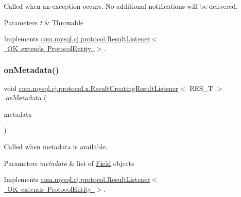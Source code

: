 Called when an exception occurs. No additional notifications will be delivered.


\begin{DoxyParams}{Parameters}
{\em t} & \mbox{\hyperlink{}{Throwable}} \\
\hline
\end{DoxyParams}


Implements \mbox{\hyperlink{interfacecom_1_1mysql_1_1cj_1_1protocol_1_1_result_listener_ab3ea59c10a6ea7cba54923bc4237dddc}{com.\+mysql.\+cj.\+protocol.\+Result\+Listener$<$ O\+K extends Protocol\+Entity $>$}}.

\mbox{\label{classcom_1_1mysql_1_1cj_1_1protocol_1_1x_1_1_result_creating_result_listener_a453e531bc60f8e74d1f19ae2ddd2fd37}} 
\subsubsection{\texorpdfstring{on\+Metadata()}{onMetadata()}}
{\footnotesize\ttfamily void \mbox{\hyperlink{classcom_1_1mysql_1_1cj_1_1protocol_1_1x_1_1_result_creating_result_listener}{com.\+mysql.\+cj.\+protocol.\+x.\+Result\+Creating\+Result\+Listener}}$<$ R\+E\+S\+\_\+T $>$.on\+Metadata (\begin{DoxyParamCaption}\item[{\mbox{\hyperlink{interfacecom_1_1mysql_1_1cj_1_1protocol_1_1_column_definition}{Column\+Definition}}}]{metadata }\end{DoxyParamCaption})}

Called when metadata is available.


\begin{DoxyParams}{Parameters}
{\em metadata} & list of \mbox{\hyperlink{}{Field}} objects \\
\hline
\end{DoxyParams}


Implements \mbox{\hyperlink{interfacecom_1_1mysql_1_1cj_1_1protocol_1_1_result_listener_a7252b90a18c4d3dc585cb7ded00b06f9}{com.\+mysql.\+cj.\+protocol.\+Result\+Listener$<$ O\+K extends Protocol\+Entity $>$}}.

